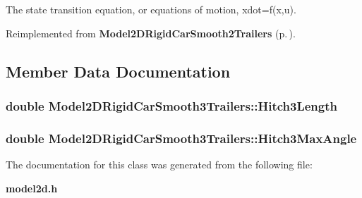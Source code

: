 The state transition equation, or equations of motion, xdot=f(x,u).



Reimplemented from {\bf Model2DRigid\-Car\-Smooth2Trailers} {\rm (p.\,\pageref{class_Model2DRigidCarSmooth2Trailers_a2})}.

\subsection{Member Data Documentation}
\subsubsection{\setlength{\rightskip}{0pt plus 5cm}double Model2DRigid\-Car\-Smooth3Trailers::Hitch3Length}\label{class_Model2DRigidCarSmooth3Trailers_m0}


\subsubsection{\setlength{\rightskip}{0pt plus 5cm}double Model2DRigid\-Car\-Smooth3Trailers::Hitch3Max\-Angle}\label{class_Model2DRigidCarSmooth3Trailers_m1}




The documentation for this class was generated from the following file:\begin{CompactItemize}
\item 
{\bf model2d.h}\end{CompactItemize}
